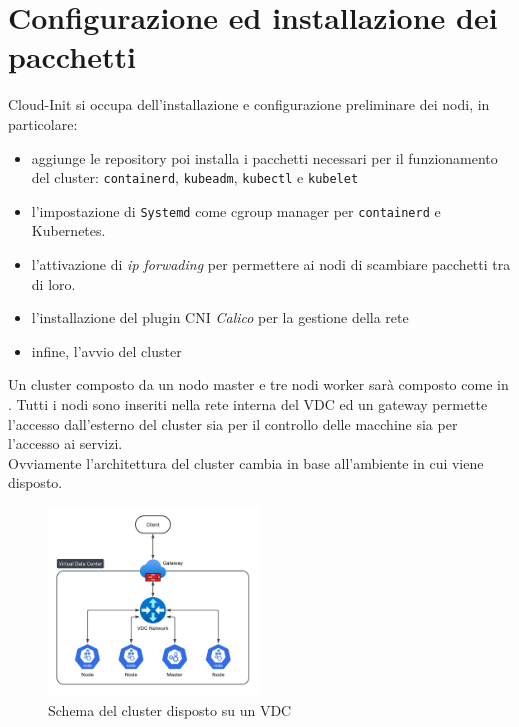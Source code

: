 \documentclass[12pt,a4paper,openright,twoside]{book}
\begin{document}
\section{Configurazione ed installazione dei pacchetti}
Cloud-Init si occupa dell'installazione e configurazione preliminare dei nodi, in particolare:
\begin{itemize}
    \item aggiunge le repository poi installa i pacchetti necessari per il funzionamento del cluster: \texttt{containerd}, \texttt{kubeadm}, \texttt{kubectl} e \texttt{kubelet}
    \item {l'impostazione di \texttt{Systemd} come cgroup manager per \texttt{containerd} e Kubernetes.
        
    }
    \item {
        l'attivazione di \textit{ip forwading} per permettere ai nodi di scambiare pacchetti tra di loro.
        
    }
    \item l'installazione del plugin CNI \textit{Calico} per la gestione della rete
    \item {
        infine, l'avvio del cluster
        
    }
\end{itemize}
Un cluster composto da un nodo master e tre nodi worker sarà composto come in . Tutti i nodi sono inseriti nella rete interna del VDC ed un gateway permette l'accesso
dall'esterno del cluster sia per il controllo delle macchine sia per l'accesso ai servizi.\\
Ovviamente l'architettura del cluster cambia in base all'ambiente in cui viene disposto.
\begin{figure}[!hbt]
    \centering
    \includegraphics[width=0.5\textwidth]{figures/kube-vdc.png}
    \caption{Schema del cluster disposto su un VDC}
    \label{fig:kube-cluster}
\end{figure}
\end{document}
